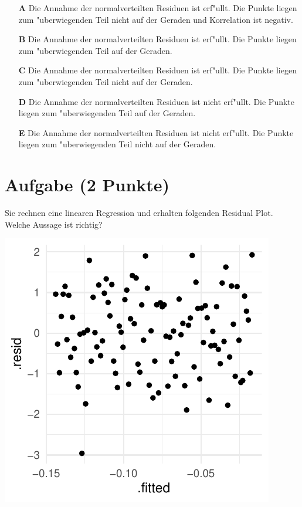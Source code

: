 \documentclass[a4paper, 10pt]{scrartcl}\usepackage[]{graphicx}\usepackage[]{xcolor}
\makeatletter
\def\maxwidth{ %
  \ifdim\Gin@nat@width>\linewidth
    \linewidth
  \else
    \Gin@nat@width
  \fi
}
\makeatother
\begin{document}
\begin{enumerate}
\item [\textbf{A} \msquare] Die Annahme der normalverteilten Residuen ist erf{"u}llt. Die Punkte liegen zum {"u}berwiegenden Teil nicht auf der Geraden und Korrelation ist negativ.
\item [\textbf{B} \msquare] Die Annahme der normalverteilten Residuen ist erf{"u}llt. Die Punkte liegen zum {"u}berwiegenden Teil auf der Geraden.
\item [\textbf{C} \msquare] Die Annahme der normalverteilten Residuen ist erf{"u}llt. Die Punkte liegen zum {"u}berwiegenden Teil nicht auf der Geraden.
\item [\textbf{D} \msquare] Die Annahme der normalverteilten Residuen ist nicht erf{"u}llt. Die Punkte liegen zum {"u}berwiegenden Teil auf der Geraden.
\item [\textbf{E} \msquare] Die Annahme der normalverteilten Residuen ist nicht erf{"u}llt. Die Punkte liegen zum {"u}berwiegenden Teil nicht auf der Geraden.
\end{enumerate}

\section{Aufgabe \hfill (2 Punkte)}

Sie rechnen eine linearen Regression und erhalten folgenden Residual
Plot. Welche Aussage ist richtig?




{\centering \includegraphics[width=\maxwidth]{img/mc-regression-06-a-1} 

}
\end{document}
